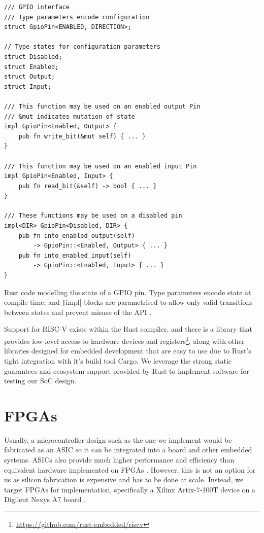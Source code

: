 \begin{listing}[H]
    \vspace{0.5cm}
    \begin{verbatim}
/// GPIO interface
/// Type parameters encode configuration
struct GpioPin<ENABLED, DIRECTION>;

// Type states for configuration parameters
struct Disabled;
struct Enabled;
struct Output;
struct Input;

/// This function may be used on an enabled output Pin
/// &mut indicates mutation of state
impl GpioPin<Enabled, Output> {
    pub fn write_bit(&mut self) { ... }
}

/// This function may be used on an enabled input Pin
impl GpioPin<Enabled, Input> {
    pub fn read_bit(&self) -> bool { ... }
}

/// These functions may be used on a disabled pin
impl<DIR> GpioPin<Disabled, DIR> {
    pub fn into_enabled_output(self) 
        -> GpioPin::<Enabled, Output> { ... }
    pub fn into_enabled_input(self) 
        -> GpioPin::<Enabled, Input> { ... }
}
    \end{verbatim}
    \caption{Rust code modelling the state of a GPIO pin. Type parameters encode state at compile time, and \texttt|impl| blocks are parametrised to allow only valid transitions between states and prevent misuse of the API \cite{embedded_rust}.}
    \label{lst:rust_gpio}
\end{listing}

Support for RISC-V exists within the Rust compiler, and there is a  library that provides low-level access to hardware devices and registers\footnote{\url{https://github.com/rust-embedded/riscv}}, along with other libraries designed for embedded development that are easy to use due to Rust's tight integration with it's build tool Cargo. We leverage the strong static guarantees and ecosystem support provided by Rust to implement software for testing our SoC design.

\section{FPGAs}

Usually, a microcontroller design such as the one we implement would be fabricated as an ASIC so it can be integrated into a board and other embedded systems. ASICs also provide much higher performance and efficiency than equivalent hardware implemented on FPGAs \cite{fpga_v_asic}. However, this is not an option for us as silicon fabrication is expensive and has to be done at scale. Instead, we target FPGAs for implementation, specifically a Xilinx Artix-7-100T device on a Digilent Nexys A7 board \cite{digilent}.

